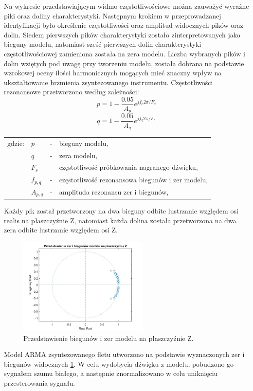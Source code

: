 Na wykresie przedstawiającym widmo częstotliwościowe można zauważyć wyraźne piki oraz doliny charakterystyki. Następnym krokiem w przeprowadzanej identyfikacji było określenie częstotliwości oraz amplitud widocznych pików oraz dolin. Siedem pierwszych pików charakterystyki zostało zinterpretowanych jako bieguny modelu, natomiast sześć pierwszych dolin charakterystyki częstotliwościowej zamieniona została na zera modelu. Liczba wybranych pików i dolin wziętych pod uwagę przy tworzeniu modelu, została dobrana na podstawie wzrokowej oceny ilości harmonicznych mogących mieć znaczny wpływ na ukształtowanie brzmienia zsyntezowanego instrumentu. Częstotliwości rezonansowe przetworzono według zależności:
\begin{equation} \label{equ:wzor3}
p = 1-\frac{0.05}{A_{p}}e^{jf_{p}2\pi/F_{s}}
\end{equation}
\begin{equation} \label{equ:wzor4}
q = 1-\frac{0.05}{A_{q}}e^{jf_{q}2\pi/F_{s}}
\end{equation}
\begin{tabular}{ l l l l}
	gdzie: & $p$ &  - & bieguny modelu, \\
	&	$q$ & - &  zera modelu, \\
	&	$F_{s}$ & - &  częstotliwość próbkowania nagranego dźwięku,\\
	&	$f_{p,q}$ & - &  częstotliwość rezonansowa biegunów i zer modelu, \\
	&	$A_{p,q}$ & - &  amplituda rezonansu zer i biegunów, \\
\end{tabular} 
\vspace{6pt}

Każdy pik został przetworzony na dwa bieguny odbite lustrzanie względem osi realis na płaszczyźnie Z, natomiast każda dolina została przetworzona na dwa zera odbite lustrzanie względem osi Z.
\begin{figure}[H]
	\centering
	\includegraphics[width=6.5cm]{grafiki/Bieguny_na_plaszcz_Z}
	\captionsetup{justification=centering}
	\caption{Przedstawienie biegunów i zer modelu na płaszczyźnie Z.}
	\label{rys:plaszcz_Z}
\end{figure}
Model ARMA zsyntezowanego fletu utworzono na podstawie wyznaczonych zer i biegunów widocznych \ref{rys:plaszcz_Z}. W celu wydobycia dźwięku z modelu, pobudzono go sygnałem szumu białego, a następnie znormalizowano w celu uniknięciu przesterowania sygnału. 


